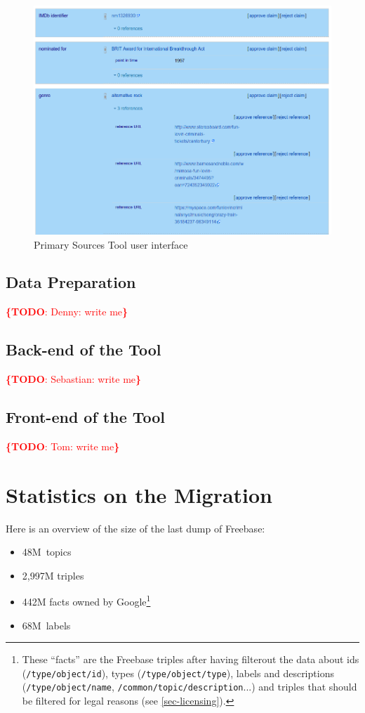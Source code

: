 \documentclass{sig-alternate}
\newcommand{\todo}[1]{\noindent\textcolor{red}{{\bf \{TODO}: #1{\bf \}}}}
\begin{document}
\begin{figure}[!htbp]
\centering
\includegraphics[width=8.45 cm]{img/primary-sources.png}
\caption{Primary Sources Tool user interface}
\label{fig:primary-sources-tool}
\end{figure}

\subsection{Data Preparation}

\todo{Denny: write me}

\subsection{Back-end of the Tool}

\todo{Sebastian: write me}

\subsection{Front-end of the Tool}

\todo{Tom: write me}

\section{Statistics on the Migration}\label{sec:statistics-of-the-migration}

Here is an overview of the size of the last dump of Freebase:

\begin{itemize}
  \setlength\itemsep{0em}
  \item 48M~topics
  \item 2,997M triples
  \item 442M facts owned by Google\footnote{These ``facts'' are the Freebase triples
      after having filterout the data about ids (\texttt{/type/object/id}),
      types (\texttt{/type/object/type}), labels and descriptions (\texttt{/type/object/name},
      \texttt{/common/topic/description}...) and triples that should be filtered
      for legal reasons (see \autoref{sec-licensing}).}
  \item 68M~labels
\end{itemize}
\end{document}
